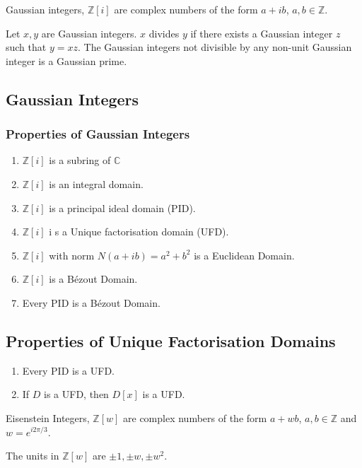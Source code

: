 \begin{definition}
	Gaussian integers, $\mathbb{Z}[i]$ are complex numbers of the form $a+ib$, $a,b \in \mathbb{Z}$.
\end{definition}

	Let $x,y$ are Gaussian integers. $x$ divides $y$ if there exists a Gaussian integer $z$ such that $y = xz$.
	The Gaussian integers not divisible by any non-unit Gaussian integer is a Gaussian prime.
\subsection{Gaussian Integers}
\subsubsection{Properties of Gaussian Integers}
	\begin{enumerate}
		\item $\mathbb{Z}[i]$ is a subring of $\mathbb{C}$
		\item $\mathbb{Z}[i]$ is an integral domain.
		\item $\mathbb{Z}[i]$ is a principal ideal domain (PID).
		\item $\mathbb{Z}[i]$ i s a Unique factorisation domain (UFD).
		\item $\mathbb{Z}[i]$ with norm $N(a+ib) = a^2+b^2$ is a Euclidean Domain.
		\item $\mathbb{Z}[i]$ is a B\'ezout Domain.
		\item Every PID is a B\'ezout Domain.
	\end{enumerate}

\subsection{Properties of Unique Factorisation Domains}
\begin{enumerate}
	\item Every PID is a UFD.
	\item If $D$ is a UFD, then $D[x]$ is a UFD.
\end{enumerate}

\begin{definition}
	Eisenstein Integers, $\mathbb{Z}[w]$ are complex numbers of the form $a+wb$, $a,b \in \mathbb{Z}$ and $w = e^{i2\pi/3}$.
\end{definition}
	The units in $\mathbb{Z}[w]$ are $\pm 1, \pm w, \pm w^2$.
